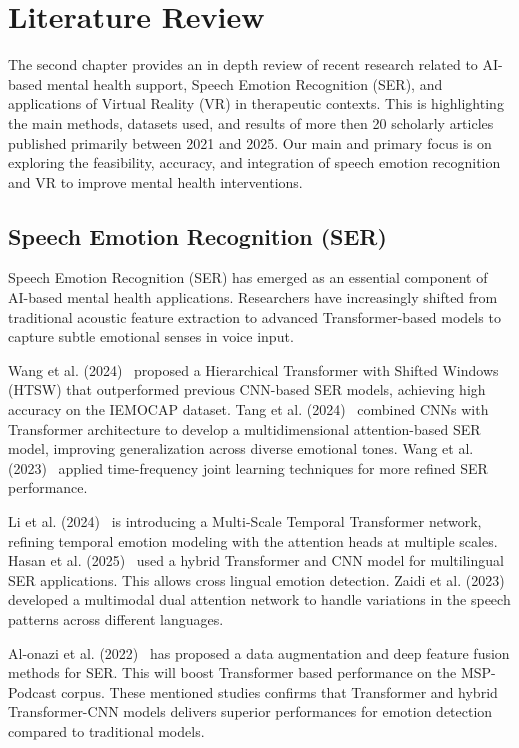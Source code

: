 \chapter{Literature Review} \label{chap:literatureReview}


The second chapter provides an in depth review of recent research related to AI-based mental
health support, Speech Emotion Recognition (SER), and applications of Virtual Reality (VR) in
therapeutic contexts. This is highlighting the main methods, datasets used, and results of more then 20 scholarly
articles published primarily between 2021 and 2025. Our main and primary focus is on exploring the
feasibility, accuracy, and integration of speech emotion recognition and VR to improve mental
health interventions.

\section{Speech Emotion Recognition (SER)}
Speech Emotion Recognition (SER) has emerged as an essential component of AI-based mental health applications. Researchers have increasingly shifted from traditional acoustic feature extraction to advanced Transformer-based models to capture subtle emotional senses in voice input.

Wang et al. (2024)~\cite{wang2024hierarchical} proposed a Hierarchical Transformer with Shifted Windows (HTSW) that outperformed previous CNN-based SER models, achieving high accuracy on the IEMOCAP dataset. Tang et al. (2024)~\cite{tang2024cnn} combined CNNs with Transformer architecture to develop a multidimensional attention-based SER model, improving generalization across diverse emotional tones. Wang et al. (2023)~\cite{wang2023tf} applied time-frequency joint learning techniques for more refined SER performance.

Li et al. (2024)~\cite{li2024multi} is introducing a Multi-Scale Temporal Transformer network, refining temporal emotion modeling with the attention heads at multiple scales. Hasan et al. (2025)~\cite{hasan2025hybrid} used a hybrid Transformer and CNN model for multilingual SER applications. This allows cross lingual emotion detection. Zaidi et al. (2023)~\cite{zaidi2023multimodal} developed a multimodal dual attention network to handle variations in the speech patterns across different languages.

Al-onazi et al. (2022)~\cite{alonazi2022fusion} has proposed a data augmentation and deep feature fusion methods for SER. This will boost Transformer based performance on the MSP-Podcast corpus. These mentioned studies confirms that Transformer and hybrid Transformer-CNN models delivers superior performances for emotion detection compared to traditional models.

